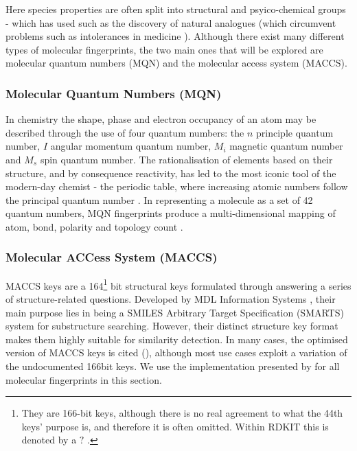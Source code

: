 Here species properties are often split into structural and psyico-chemical groups - which has used such as the discovery of natural analogues (which circumvent problems such as intolerances in medicine \citep{analog}). Although there exist many different types of molecular fingerprints, the two main ones that will be explored are molecular quantum numbers (MQN) and the molecular access system (MACCS). 

\subsubsection{Molecular Quantum Numbers (MQN)}
In chemistry the shape, phase and electron occupancy of an atom may be described through the use of four quantum numbers: the $n$ principle quantum number, $I$ angular momentum quantum number, $M_i$ magnetic quantum number and $M_s$ spin quantum number. The rationalisation of elements based on their structure, and by consequence reactivity, has led to the most iconic tool of the modern-day chemist - the periodic table, where increasing atomic numbers follow the principal quantum number \citep{periodic}. In representing a molecule as a set of 42 quantum numbers, MQN fingerprints produce a multi-dimensional mapping of atom, bond, polarity and topology count \citep{MQN}. 


\subsubsection{Molecular ACCess System (MACCS)}
MACCS keys are a 164\footnote{They are 166-bit keys, although there is no real agreement to what the 44th keys' purpose is, and therefore it is often omitted. Within RDKIT this is denoted by a $?$ \citep{rdkitcode}.} bit structural keys formulated through answering a series of structure-related questions. Developed by MDL Information Systems \citep{maccs}, their main purpose lies in being a SMILES Arbitrary Target Specification (SMARTS) system for substructure searching. However, their distinct structure key format makes them highly suitable for similarity detection. In many cases, the optimised version of MACCS keys is cited (\citep{optimised}), although most use cases exploit a variation of the undocumented 166bit keys. We use the implementation presented by \citep{rdkit,rdkitcode} for all molecular fingerprints in this section.


